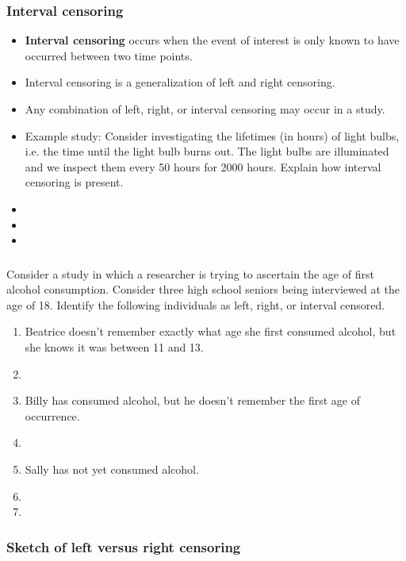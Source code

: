 \begin{frame}
\frametitle{Interval censoring}
\begin{itemize}
\item \textbf{Interval censoring} occurs when the event of interest is only known to have occurred between two time points.
\item Interval censoring is a generalization of left and right censoring.
\item Any combination of left, right, or interval censoring may occur in a study.
\item Example study: Consider investigating the lifetimes (in hours) of light bulbs, i.e. the time until the light bulb burns out. The light bulbs are
illuminated and we inspect them every 50 hours for 2000 hours.  Explain how interval censoring is present.
\item[]
\item[]
\item[]
\end{itemize}
\end{frame}

\begin{frame}
\frametitle{\grp}
\begin{clicker}{Consider a study in which a researcher is trying to ascertain the age of first alcohol consumption.  Consider three high school seniors being interviewed at the age of 18.  Identify the following individuals as left, right, or interval censored.}
\begin{enumerate}
\item Beatrice doesn't remember exactly what age she first consumed alcohol, but she knows it was between 11 and 13.
\item[] %
\item Billy has consumed alcohol, but he doesn't remember the first age of occurrence.
\item[] %
\item Sally has not yet consumed alcohol.
\item[] %
\item[]
\end{enumerate}
\end{clicker}
\end{frame}

\begin{frame}
\frametitle{Sketch of left versus right censoring}
\end{frame}



